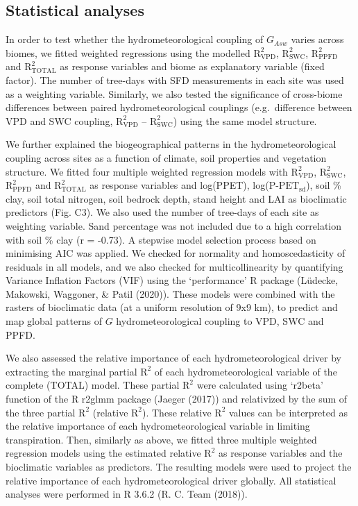 \documentclass[11pt,twoside]{reedthesis}
\begin{document}
\subsection{Statistical analyses}\label{statistical-analyses}

In order to test whether the hydrometeorological coupling of \(G_{Asw}\)
varies across biomes, we fitted weighted regressions using the modelled
\(\text{R}^2_{\text{VPD}}\), \(\text{R}^2_{\text{SWC}}\),
\(\text{R}^2_{\text{PPFD}}\) and \(\text{R}^2_{\text{TOTAL}}\) as
response variables and biome as explanatory variable (fixed factor). The
number of tree-days with SFD measurements in each site was used as a
weighting variable. Similarly, we also tested the significance of
cross-biome differences between paired hydrometeorological couplings
(e.g.~difference between VPD and SWC coupling,
\(\text{R}^2_{\text{VPD}}\) -- \(\text{R}^2_{\text{SWC}}\)) using the
same model structure.\par

We further explained the biogeographical patterns in the
hydrometeorological coupling across sites as a function of climate, soil
properties and vegetation structure. We fitted four multiple weighted
regression models with \(\text{R}^2_{\text{VPD}}\),
\(\text{R}^2_{\text{SWC}}\), \(\text{R}^2_{\text{PPFD}}\) and
\(\text{R}^2_{\text{TOTAL}}\) as response variables and log(PPET),
log(\(\text{P-PET}_{\text{sd}}\)), soil \% clay, soil total nitrogen,
soil bedrock depth, stand height and LAI as bioclimatic predictors (Fig.
C3). We also used the number of tree-days of each site as weighting
variable. Sand percentage was not included due to a high correlation
with soil \% clay (r = -0.73). A stepwise model selection process based
on minimising AIC was applied. We checked for normality and
homoscedasticity of residuals in all models, and we also checked for
multicollinearity by quantifying Variance Inflation Factors (VIF) using
the `performance' R package (Lüdecke, Makowski, Waggoner, \& Patil
(2020)). These models were combined with the rasters of bioclimatic data
(at a uniform resolution of 9x9 km), to predict and map global patterns
of \(G\) hydrometeorological coupling to VPD, SWC and PPFD.\par

We also assessed the relative importance of each hydrometeorological
driver by extracting the marginal partial \(\text{R}^2\) of each
hydrometeorological variable of the complete (TOTAL) model. These
partial \(\text{R}^2\) were calculated using `r2beta' function of the R
r2glmm package (Jaeger (2017)) and relativized by the sum of the three
partial \(\text{R}^2\) (relative \(\text{R}^2\)). These relative
\(\text{R}^2\) values can be interpreted as the relative importance of
each hydrometeorological variable in limiting transpiration. Then,
similarly as above, we fitted three multiple weighted regression models
using the estimated relative \(\text{R}^2\) as response variables and
the bioclimatic variables as predictors. The resulting models were used
to project the relative importance of each hydrometeorological driver
globally. All statistical analyses were performed in R 3.6.2 (R. C. Team
(2018)).\par
\end{document}

